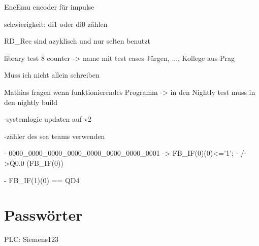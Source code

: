 EncEmu encoder für impulse 

schwierigkeit: di1 oder di0 zählen

RD\_Rec sind azyklisch und nur selten benutzt

library test 8 counter -> name mit test cases Jürgen, ..., Kollege aus Prag

Muss ich nicht allein schreiben

Mathias fragen wenn funktionierendes Programm -> in den Nightly test muss in den nightly build

-systemlogic updaten auf v2 

-zähler des sea teams verwenden

- 0000\_0000\_0000\_0000\_0000\_0000\_0000\_0001 -> FB\_IF(0)(0)<='1';
-    /->Q0.0                          (FB\_IF(0))

- FB\_IF(1)(0) == QD4
\chapter{Passwörter}

PLC: Siemens123